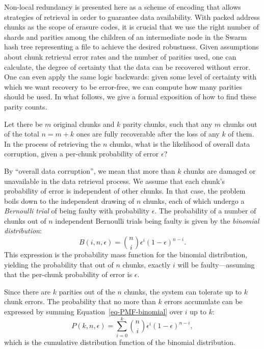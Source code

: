 \documentclass[manuscript,screen,review]{acmart}
\begin{document}
Non-local redundancy is presented here as a scheme of encoding that allows strategies of retrieval in order to guarantee data availability.
With packed address chunks as the scope of erasure codes, it is crucial that we use the right number of shards and parities among the children of an intermediate node in the Swarm hash tree representing a file to achieve the desired robustness.
Given assumptions about chunk retrieval error rates and the number of parities used, one can calculate, the degree of certainty that the data can be recovered without error. One can even apply the same logic backwards: given some level of certainty with which we want recovery to be error-free, we can compute how many parities should be used.
In what follows, we give a formal exposition of how to find these parity counts.


Let there be $m$ original chunks and $k$ parity chunks, such that any $m$ chunks out of the total $n = m + k$ ones are fully recoverable after the loss of any $k$ of them. In the process of retrieving the $n$ chunks, what is the likelihood of overall data corruption, given a per-chunk probability of error $\epsilon$?

By ``overall data corruption'', we mean that more than $k$ chunks are damaged or unavailable in the data retrieval process. We assume that each chunk's probability of error is independent of other chunks. In that case, the problem boils down to the independent drawing of $n$ chunks, each of which undergo a \emph{Bernoulli trial} of being faulty with probability $\epsilon$. The probability of a number of chunks out of $n$ independent Bernoulli trials being faulty is given by the \emph{binomial distribution}:
\begin{equation}
  B(i, n, \epsilon) = \binom{n}{i} \epsilon^i (1-\epsilon)^{n-i} .
  \label{eq-PMF-binomial}
\end{equation}
This expression is the probability mass function for the binomial distribution, yielding the probability that out of $n$ chunks, exactly $i$ will be faulty---assuming that the per-chunk probability of error is $\epsilon$.

Since there are $k$ parities out of the $n$ chunks, the system can tolerate up to $k$ chunk errors. The probability that no more than $k$ errors accumulate can be expressed by summing Equation~\ref{eq-PMF-binomial} over $i$ up to $k$:
\begin{equation}
  P(k, n, \epsilon) = \sum_{i=0}^k \binom{n}{i} \epsilon^i (1-\epsilon)^{n-i} ,
  \label{eq-CDF-binomial}
\end{equation}
which is the cumulative distribution function of the binomial distribution.
\end{document}
